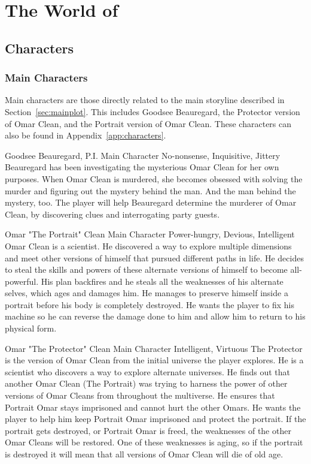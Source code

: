 \chapter{The World of \ourgame{}}





\clearpage
\section{Characters}

\subsection{Main Characters}
Main characters are those directly related to the main storyline described in Section~\ref{sec:mainplot}. This includes Goodsee Beauregard, the Protector version of Omar Clean, and the Portrait version of Omar Clean. These characters can also be found in Appendix~\ref{app:characters}.

{Goodsee Beauregard, P.I.}
{Main Character}
{No-nonsense, Inquisitive, Jittery}
{Beauregard has been investigating the mysterious Omar Clean for her own purposes. When Omar Clean is murdered, she becomes obsessed with solving the murder and figuring out the mystery behind the man. And the man behind the mystery, too.}
{The player will help Beauregard determine the murderer of Omar Clean, by discovering clues and interrogating party guests.}

{Omar "The Portrait" Clean}
{Main Character}
{Power-hungry, Devious, Intelligent}
{Omar Clean is a scientist. He discovered a way to explore multiple dimensions and meet other versions of himself that pursued different paths in life. He decides to steal the skills and powers of these alternate versions of himself to become all-powerful. His plan backfires and he steals all the weaknesses of his alternate selves, which ages and damages him. He manages to preserve himself inside a portrait before his body is completely destroyed.}
{He wants the player to fix his machine so he can reverse the damage done to him and allow him to return to his physical form.}

{Omar "The Protector" Clean}
{Main Character}
{Intelligent, Virtuous}
{The Protector is the version of Omar Clean from the initial universe the player explores. He is a scientist who discovers a way to explore alternate universes. He finds out that another Omar Clean (The Portrait) was trying to harness the power of other versions of Omar Cleans from throughout the multiverse. He ensures that Portrait Omar stays imprisoned and cannot hurt the other Omars.}
{He wants the player to help him keep Portrait Omar imprisoned and protect the portrait. If the portrait gets destroyed, or Portrait Omar is freed, the weaknesses of the other Omar Cleans will be restored. One of these weaknesses is aging, so if the portrait is destroyed it will mean that all versions of Omar Clean will die of old age.}

